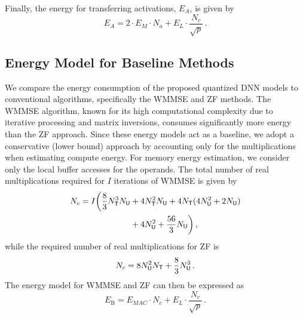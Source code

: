 Finally, the energy for transferring activations, \(E_A\), is given by
\begin{equation}\label{eq:activation-energy}
    E_A = 2 \cdot E_M \cdot N_a + E_L \cdot \frac{N_c}{\sqrt{p}}\,.
\end{equation}


\subsection{Energy Model for Baseline Methods}\label{sec:energy_baselines}
We compare the energy consumption of the proposed quantized DNN models to conventional algorithms, specifically the \gls{WMMSE} and \gls{ZF} methods. The \gls{WMMSE} algorithm, known for its high computational complexity due to iterative processing and matrix inversions, consumes significantly more energy than the \gls{ZF} approach. 
Since these energy models act as a baseline, we adopt a conservative (lower bound) approach by accounting only for the multiplications when estimating compute energy. For memory energy estimation, we consider only the local buffer accesses for the operands.
The total number of real multiplications required for $I$ iterations of \gls{WMMSE} is given by
\begin{align}
 N_c = I\bigg(\frac{8}{3} N_{\sf{T}}^3N_{\sf{U}} &+ 4N_{\sf{T}}^2N_{\sf{U}} 
 + 4N_{\sf{T}}(4N_{\sf{U}}^2+2N_{\sf{U}})\notag\\
 &+ 4N_{\sf{U}}^2
 +\frac{56}{3}N_{\sf{U}}\bigg)  \, ,
\end{align}
while the required number of real multiplications for ZF is
\begin{equation}
    N_c = 8 N_{\sf{U}}^2 N_{\sf{T}} + \frac{8}{3} N_{\sf{U}}^3 \, .
\end{equation}
The energy model for WMMSE and ZF can then be expressed as
\begin{equation}
    E_{\mathrm{B}} = E_{MAC} \cdot N_c + E_L\cdot\frac{N_c}{\sqrt{p}} \, .
\end{equation}


